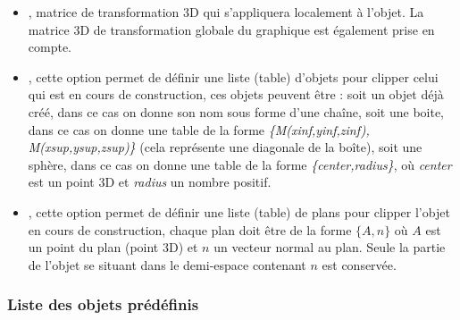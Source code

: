\begin{itemize}
\begin{itemize}
            \item {}, nombre entre $0$ et $1$ définissant l'opacité de l'objet.
            
            \item {},  et  : trois paramètres définissant le \emph{finish}.
            
            \item {}, ce paramètre permet définir sous forme d'une chaîne sa propre texture, ou bien de donner le nom d'une texture déjà connue de \povray, dans ce cas les paramètres précédents ne sont pas pris en compte. Par exemple:  (cette texture est déclarée dans le fichier \emph{textures.inc}).
        \end{itemize}
        
    \item {}, matrice de transformation 3D qui s'appliquera localement à l'objet. La matrice 3D de transformation globale du graphique est également prise en compte.
    
    \item {}, cette option permet de définir une liste (table) d'objets pour clipper celui qui est en cours de construction, ces objets peuvent être : soit un objet déjà créé, dans ce cas on donne son nom sous forme d'une chaîne, soit une boite, dans ce cas on donne une table de la forme \emph{\{M(xinf,yinf,zinf), M(xsup,ysup,zsup)\}} (cela représente une diagonale de la boîte), soit une sphère, dans ce cas on donne une table de la forme \emph{\{center,radius\}}, où \emph{center} est un point 3D et \emph{radius} un nombre positif.
    
    \item {}, cette option permet de définir une liste (table) de plans pour clipper l'objet en cours de construction, chaque plan doit être de la forme $\{A,n\}$ où $A$ est un point du plan (point 3D) et $n$ un vecteur normal au plan. Seule la partie de l'objet se situant dans le demi-espace contenant $n$ est conservée.
\end{itemize}

\subsubsection{Liste des objets prédéfinis}

